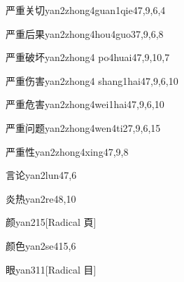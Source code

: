 \begin{verbete}{严重关切}{yan2zhong4guan1qie4}{7,9,6,4}
\end{verbete}

\begin{verbete}{严重后果}{yan2zhong4hou4guo3}{7,9,6,8}
\end{verbete}

\begin{verbete}{严重破坏}{yan2zhong4 po4huai4}{7,9,10,7}
\end{verbete}

\begin{verbete}{严重伤害}{yan2zhong4 shang1hai4}{7,9,6,10}
\end{verbete}

\begin{verbete}{严重危害}{yan2zhong4wei1hai4}{7,9,6,10}
\end{verbete}

\begin{verbete}{严重问题}{yan2zhong4wen4ti2}{7,9,6,15}
\end{verbete}

\begin{verbete}{严重性}{yan2zhong4xing4}{7,9,8}
\end{verbete}

\begin{verbete}{言论}{yan2lun4}{7,6}
\end{verbete}

\begin{verbete}{炎热}{yan2re4}{8,10}
\end{verbete}

\begin{verbete}{颜}{yan2}{15}[Radical 頁]
\end{verbete}

\begin{verbete}{颜色}{yan2se4}{15,6}
\end{verbete}

\begin{verbete}{眼}{yan3}{11}[Radical 目]
\end{verbete}

